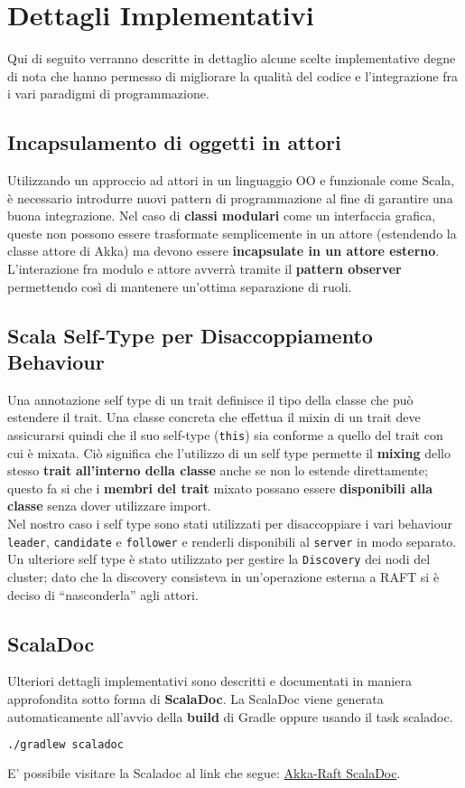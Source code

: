 \section{Dettagli Implementativi}
Qui di seguito verranno descritte in dettaglio alcune scelte implementative degne di nota che hanno permesso di migliorare la qualità del codice e l'integrazione fra i vari paradigmi di programmazione.

  \subsection{Incapsulamento di oggetti in attori}
  Utilizzando un approccio ad attori in un linguaggio OO e funzionale come Scala, è necessario introdurre nuovi pattern di programmazione al fine di garantire una buona integrazione. Nel caso di \textbf{classi modulari} come un interfaccia grafica, queste non possono essere trasformate semplicemente in un attore (estendendo la classe attore di Akka) ma devono essere \textbf{incapsulate in un attore esterno}. L'interazione fra modulo e attore avverrà tramite il \textbf{pattern observer} permettendo così di mantenere un'ottima separazione di ruoli.

  \subsection{Scala Self-Type per Disaccoppiamento Behaviour}
  Una annotazione self type di un trait definisce il tipo della classe che può estendere il trait. Una classe concreta che effettua il mixin di un trait deve assicurarsi quindi che il suo self-type (\texttt{this}) sia conforme a quello del trait con cui è mixata. Ciò significa che l'utilizzo di un self type permette il \textbf{mixing} dello stesso \textbf{trait} \textbf{all'interno della classe} anche se non lo estende direttamente; questo fa si che i \textbf{membri del trait} mixato possano essere \textbf{disponibili alla classe} senza dover utilizzare import.\\
  Nel nostro caso i self type sono stati utilizzati per disaccoppiare i vari behaviour \texttt{leader}, \texttt{candidate} e \texttt{follower} e renderli disponibili al \texttt{server} in modo separato. Un ulteriore self type è stato utilizzato per gestire la \texttt{Discovery} dei nodi del cluster; dato che la discovery consisteva in un'operazione esterna a RAFT si è deciso di ``nasconderla'' agli attori.

  \subsection{ScalaDoc}
  Ulteriori dettagli implementativi sono descritti e documentati in maniera approfondita sotto forma di \textbf{ScalaDoc}. La ScalaDoc viene generata automaticamente all'avvio della \textbf{build} di Gradle oppure usando il task scaladoc.
  \begin{lstlisting}[language=bash]
  ./gradlew scaladoc
  \end{lstlisting}
  E' possibile visitare la Scaladoc al link che segue: \href{http://akka-raft.surge.sh/}{Akka-Raft ScalaDoc}.